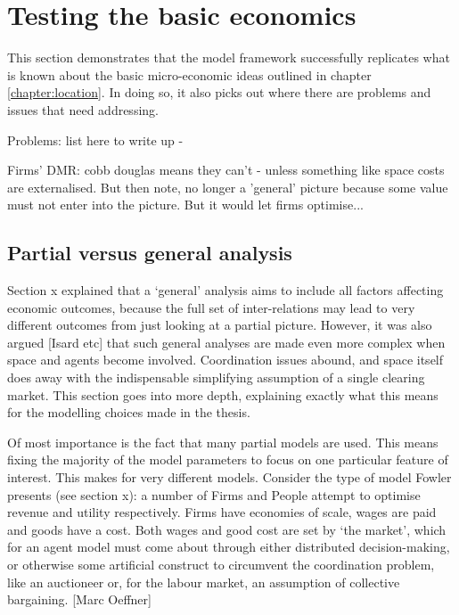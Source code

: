 \section{Testing the basic economics \label{sec:frameworktestingbasicecons}}

This section demonstrates that the model framework successfully replicates what is known about the basic micro-economic ideas outlined in chapter \ref{chapter:location}. In doing so, it also picks out where there are problems and issues that need addressing.


Problems: list here to write up -

Firms' DMR: cobb douglas means they can't - unless something like space costs are externalised. But then note, no longer a 'general' picture because some value must not enter into the picture. But it would let firms optimise...

\subsection{Partial versus general analysis \label{sec:partialvsgeneral}}


Section x explained that a `general' analysis aims to include all factors affecting economic outcomes, because the full set of inter-relations may lead to very different outcomes from just looking at a partial picture. However, it was also argued [Isard etc] that such general analyses are made even more complex when space and agents become involved. Coordination issues abound, and space itself does away with the indispensable simplifying assumption of a single clearing market. This section goes into more depth, explaining exactly what this means for the modelling choices made in the thesis.

Of most importance is the fact that many partial models are used. This means fixing the majority of the model parameters to focus on one particular feature of interest. This makes for very different models. Consider the type of model Fowler presents (see section x): a number of Firms and People attempt to optimise revenue and utility respectively. Firms have economies of scale, wages are paid and goods have a cost. Both wages and good cost are set by `the market', which for an agent model must come about through either distributed decision-making, or otherwise some artificial construct to circumvent the coordination problem, like an auctioneer or, for the labour market, an assumption of collective bargaining. [Marc Oeffner]

